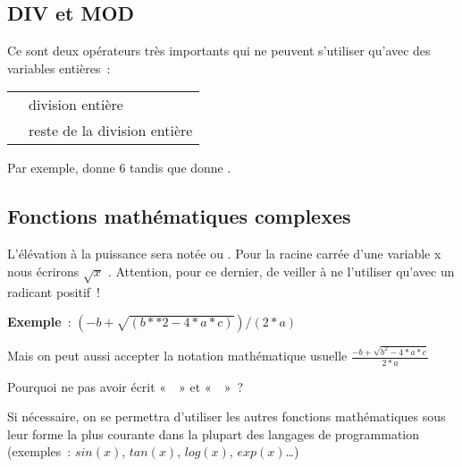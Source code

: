 		\subsection{DIV et MOD}
	
			Ce sont deux opérateurs très importants qui ne peuvent s’utiliser
			qu’avec des variables entières~:
	
			\begin{center}
			\begin{tabular}{m{1cm}|m{12cm}}
			\raggedleft  \pseudocode{DIV} & division entière\\
			\raggedleft  \pseudocode{MOD} & reste de la division entière\\
			\end{tabular}
			\end{center}
	
			Par exemple,  donne 6 tandis que
			 donne .
	
		\subsection{Fonctions mathématiques complexes}
	
			L’élévation à la puissance sera notée \pseudocode{**} ou
			\pseudocode{\^{}} . Pour la racine carrée d’une variable x nous
			écrirons  $\sqrt{x}$ \textit{.} Attention, pour ce dernier, de veiller
			à ne l’utiliser qu’avec un radicant positif~!
	
			\textbf{Exemple}~: 
			$(-b+\sqrt{(b\ast \ast 2-4\ast a\ast c)})/(2\ast a)$
			
			Mais on peut aussi accepter la notation mathématique usuelle
			$\frac{-b+\sqrt{b^{2}-4\ast a\ast c}}{2\ast a}$ 
	
			Pourquoi ne pas avoir écrit «~~» et
			«~~»~?
	
			Si nécessaire, on se permettra d’utiliser les autres
			fonctions mathématiques sous leur forme la plus courante dans la
			plupart des langages de programmation (exemples~:
			$sin(x)$, $tan(x)$, $log(x)$, $exp(x)$\dots)
				
		
		
